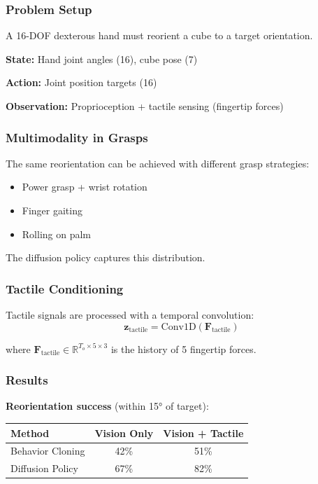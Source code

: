 \subsubsection{Problem Setup}

A 16-DOF dexterous hand must reorient a cube to a target orientation.

\textbf{State:} Hand joint angles (16), cube pose (7)

\textbf{Action:} Joint position targets (16)

\textbf{Observation:} Proprioception + tactile sensing (fingertip forces)

\subsubsection{Multimodality in Grasps}

The same reorientation can be achieved with different grasp strategies:
\begin{itemize}
    \item Power grasp + wrist rotation
    \item Finger gaiting
    \item Rolling on palm
\end{itemize}

The diffusion policy captures this distribution.

\subsubsection{Tactile Conditioning}

Tactile signals are processed with a temporal convolution:
\begin{equation}
\mathbf{z}_{\text{tactile}} = \text{Conv1D}(\mathbf{F}_{\text{tactile}})
\label{eq:tactile_encoding}
\end{equation}

where $\mathbf{F}_{\text{tactile}} \in \mathbb{R}^{T_o \times 5 \times 3}$ is the history of 5 fingertip forces.

\subsubsection{Results}

\textbf{Reorientation success} (within 15° of target):
\begin{center}
\begin{tabular}{lcc}
\toprule
\textbf{Method} & \textbf{Vision Only} & \textbf{Vision + Tactile} \\
\midrule
Behavior Cloning & 42\% & 51\% \\
Diffusion Policy & 67\% & 82\% \\
\bottomrule
\end{tabular}
\end{center}

